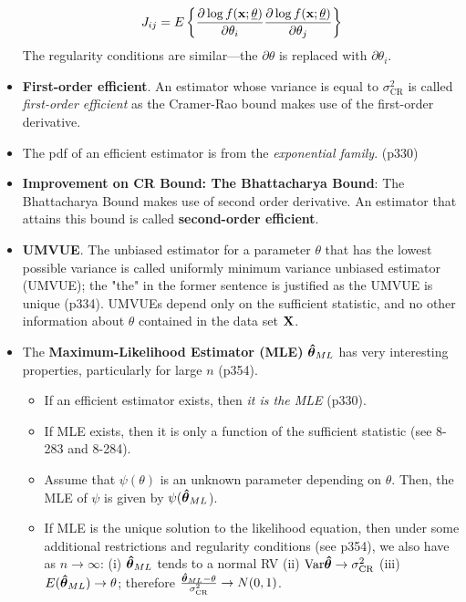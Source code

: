 \documentclass[a4paper, oneside]{book}
\begin{document}
\begin{itemize}
\begin{equation}
J_{ij} = E\left\{ \frac{\partial \log f(\mathbf{x}; \underline{\theta})}{\partial \theta_i}\frac{\partial \log f(\mathbf{x}; \underline{\theta})}{\partial \theta_j} \right\}
\end{equation}
The regularity conditions are similar\----the $\partial \theta$ is replaced with $\partial \theta_i$.
\item \textbf{First-order efficient}. An estimator whose variance is equal to $\sigma_{\text{CR}}^2$ is called \textit{first-order efficient} as the Cramer-Rao bound makes use of the first-order derivative.
\item The pdf of an efficient estimator is from the \textit{exponential family}.  (p330)
\item \textbf{Improvement on CR Bound: The Bhattacharya Bound}: The Bhattacharya Bound makes use of second order derivative. An estimator that attains this bound is called \textbf{second-order efficient}.
\item \textbf{UMVUE}. The unbiased estimator for a parameter $\theta$ that has the lowest possible variance is called uniformly minimum variance unbiased estimator (UMVUE); the "the" in the former sentence is justified as the UMVUE is unique (p334). UMVUEs depend only on the sufficient statistic, and no other information about $\theta$ contained in the data set $\mathbf{X}$. 
\item The \textbf{Maximum-Likelihood Estimator (MLE)} $\boldsymbol{\hat{\theta}}_{ML}$ has very interesting properties, particularly for large $n$ (p354).
	\begin{itemize}
	\item If an efficient estimator exists, then \textit{it is the MLE} (p330). 
	\item If MLE exists, then it is only a function of the sufficient statistic (see 8-283 and 8-284).
	\item Assume that $\psi(\theta)$ is an unknown parameter depending on $\theta$. Then, the MLE of $\psi$ is given by $\psi(\boldsymbol{\hat{\theta}}_{ML}$).
	\item If MLE is the unique solution to the likelihood equation, then under some additional restrictions and regularity conditions (see p354), we also have as $n\to \infty$: (i) $\boldsymbol{\hat{\theta}}_{ML}$ tends to a normal RV (ii) $\text{Var}{\boldsymbol{\hat{\theta}}} \to \sigma^2_{\text{CR}}$ (iii) $E(\boldsymbol{\hat{\theta}}_{ML}) \to \theta$; therefore $\frac{\boldsymbol{\hat{\theta}}_{ML}-\theta}{\sigma^2_{\text{CR}}}\to N(0,1)$. 
	\end{itemize}
\end{itemize}
\end{document}
